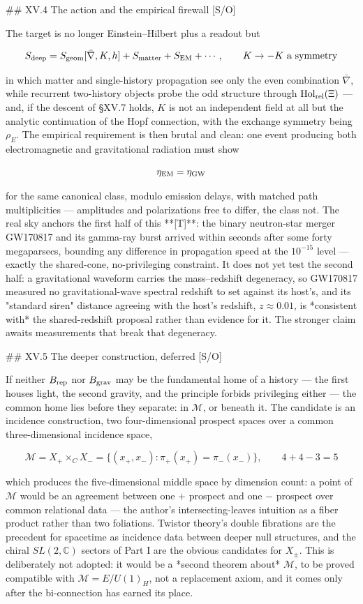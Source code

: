 ## XV.4 The action and the empirical firewall [S/O]

The target is no longer Einstein–Hilbert plus a readout but

$$S_{\rm deep} = S_{\rm geom}[\bar\nabla,K,h]+S_{\rm matter}+S_{\rm EM}+\cdots,\qquad K\to-K\ \text{a symmetry}$$

in which matter and single-history propagation see only the even combination $\bar\nabla$, while recurrent two-history objects probe the odd structure through ${\rm Hol}_{\rm rel}(\Xi)$ — and, if the descent of §XV.7 holds, $K$ is not an independent field at all but the analytic continuation of the Hopf connection, with the exchange symmetry being $\rho_E$. The empirical requirement is then brutal and clean: one event producing both electromagnetic and gravitational radiation must show

$$\eta_{\rm EM} = \eta_{\rm GW}$$

for the same canonical class, modulo emission delays, with matched path multiplicities — amplitudes and polarizations free to differ, the class not. The real sky anchors the first half of this **[T]**: the binary neutron-star merger GW170817 and its gamma-ray burst arrived within seconds after some forty megaparsecs, bounding any difference in propagation speed at the $10^{-15}$ level — exactly the shared-cone, no-privileging constraint. It does not yet test the second half: a gravitational waveform carries the mass–redshift degeneracy, so GW170817 measured no gravitational-wave spectral redshift to set against its host's, and its "standard siren" distance agreeing with the host's redshift, $z\approx0.01$, is *consistent with* the shared-redshift proposal rather than evidence for it. The stronger claim awaits measurements that break that degeneracy.

## XV.5 The deeper construction, deferred [S/O]

If neither $B_{\rm rep}$ nor $B_{\rm grav}$ may be the fundamental home of a history — the first houses light, the second gravity, and the principle forbids privileging either — the common home lies before they separate: in $\mathcal M$, or beneath it. The candidate is an incidence construction, two four-dimensional prospect spaces over a common three-dimensional incidence space,

$$\mathcal M = X_+\times_CX_- = \{(x_+,x_-):\pi_+(x_+) = \pi_-(x_-)\},\qquad 4+4-3 = 5$$

which produces the five-dimensional middle space by dimension count: a point of $\mathcal M$ would be an agreement between one $+$ prospect and one $-$ prospect over common relational data — the author's intersecting-leaves intuition as a fiber product rather than two foliations. Twistor theory's double fibrations are the precedent for spacetime as incidence data between deeper null structures, and the chiral $SL(2,\mathbb C)$ sectors of Part I are the obvious candidates for $X_\pm$. This is deliberately not adopted: it would be a *second theorem about* $\mathcal M$, to be proved compatible with $\mathcal M = E/U(1)_H$, not a replacement axiom, and it comes only after the bi-connection has earned its place.

